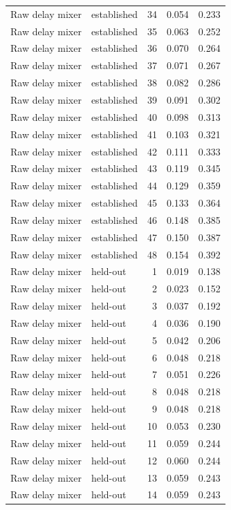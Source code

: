 \begin{tabular}{llrrr}
Raw delay mixer & established & 34 & 0.054 & 0.233 \\
Raw delay mixer & established & 35 & 0.063 & 0.252 \\
Raw delay mixer & established & 36 & 0.070 & 0.264 \\
Raw delay mixer & established & 37 & 0.071 & 0.267 \\
Raw delay mixer & established & 38 & 0.082 & 0.286 \\
Raw delay mixer & established & 39 & 0.091 & 0.302 \\
Raw delay mixer & established & 40 & 0.098 & 0.313 \\
Raw delay mixer & established & 41 & 0.103 & 0.321 \\
Raw delay mixer & established & 42 & 0.111 & 0.333 \\
Raw delay mixer & established & 43 & 0.119 & 0.345 \\
Raw delay mixer & established & 44 & 0.129 & 0.359 \\
Raw delay mixer & established & 45 & 0.133 & 0.364 \\
Raw delay mixer & established & 46 & 0.148 & 0.385 \\
Raw delay mixer & established & 47 & 0.150 & 0.387 \\
Raw delay mixer & established & 48 & 0.154 & 0.392 \\
Raw delay mixer & held-out & 1 & 0.019 & 0.138 \\
Raw delay mixer & held-out & 2 & 0.023 & 0.152 \\
Raw delay mixer & held-out & 3 & 0.037 & 0.192 \\
Raw delay mixer & held-out & 4 & 0.036 & 0.190 \\
Raw delay mixer & held-out & 5 & 0.042 & 0.206 \\
Raw delay mixer & held-out & 6 & 0.048 & 0.218 \\
Raw delay mixer & held-out & 7 & 0.051 & 0.226 \\
Raw delay mixer & held-out & 8 & 0.048 & 0.218 \\
Raw delay mixer & held-out & 9 & 0.048 & 0.218 \\
Raw delay mixer & held-out & 10 & 0.053 & 0.230 \\
Raw delay mixer & held-out & 11 & 0.059 & 0.244 \\
Raw delay mixer & held-out & 12 & 0.060 & 0.244 \\
Raw delay mixer & held-out & 13 & 0.059 & 0.243 \\
Raw delay mixer & held-out & 14 & 0.059 & 0.243 \\

\end{tabular}
